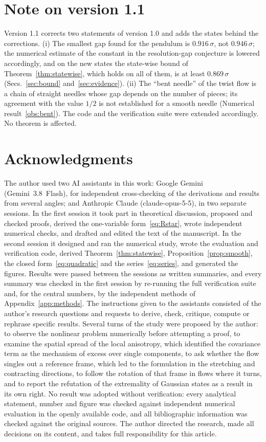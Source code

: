 \section*{Note on version 1.1}
Version 1.1 corrects two statements of version 1.0 and adds the states behind the corrections. (i) The smallest gap found for the pendulum is $0.916\,\sigma$, not $0.946\,\sigma$; the numerical estimate of the constant in the resolution-gap conjecture is lowered accordingly, and on the new states the state-wise bound of Theorem~\ref{thm:statewise}, which holds on all of them, is at least $0.869\,\sigma$ (Secs.~\ref{sec:bound} and~\ref{sec:evidence}). (ii) The ``bent needle'' of the twist flow is a chain of straight needles whose gap depends on the number of pieces; its agreement with the value $1/2$ is not established for a smooth needle (Numerical result~\ref{obs:bent}). The code and the verification suite were extended accordingly. No theorem is affected.

\section*{Acknowledgments}
The author used two AI assistants in this work: Google Gemini (\mbox{Gemini 3.8 Flash}), for independent cross-checking of the derivations and results from several angles; and Anthropic Claude (\mbox{claude-opus-5-5}), in two separate sessions. In the first session it took part in theoretical discussion, proposed and checked proofs, derived the one-variable form~\eqref{eq:Rstar}, wrote independent numerical checks, and drafted and edited the text of the manuscript. In the second session it designed and ran the numerical study, wrote the evaluation and verification code, derived Theorem~\ref{thm:statewise}, Proposition~\ref{prop:smooth}, the closed form~\eqref{eq:quadratic} and the series~\eqref{eq:series}, and generated the figures. Results were passed between the sessions as written summaries, and every summary was checked in the first session by re-running the full verification suite and, for the central numbers, by the independent methods of Appendix~\ref{app:methods}. The instructions given to the assistants consisted of the author's research questions and requests to derive, check, critique, compute or rephrase specific results. Several turns of the study were proposed by the author: to observe the nonlinear problem numerically before attempting a proof, to examine the spatial spread of the local anisotropy, which identified the covariance term as the mechanism of excess over single components, to ask whether the flow singles out a reference frame, which led to the formulation in the stretching and contracting directions, to follow the rotation of that frame in flows where it turns, and to report the refutation of the extremality of Gaussian states as a result in its own right. No result was adopted without verification: every analytical statement, number and figure was checked against independent numerical evaluation in the openly available code, and all bibliographic information was checked against the original sources. The author directed the research, made all decisions on its content, and takes full responsibility for this article.

